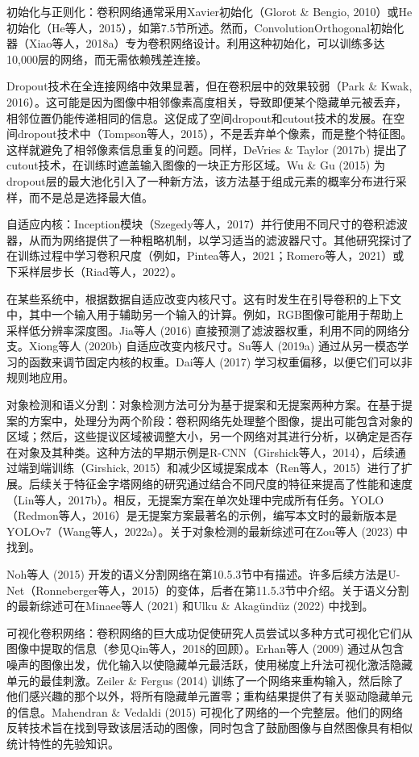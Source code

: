 \documentclass[lang=cn,newtx,10pt,scheme=chinese]{elegantbook}
\begin{document}
初始化与正则化：卷积网络通常采用Xavier初始化（Glorot \& Bengio, 2010）或He初始化（He等人，2015），如第7.5节所述。然而，ConvolutionOrthogonal初始化器（Xiao等人，2018a）专为卷积网络设计。利用这种初始化，可以训练多达10,000层的网络，而无需依赖残差连接。

Dropout技术在全连接网络中效果显著，但在卷积层中的效果较弱（Park \& Kwak, 2016）。这可能是因为图像中相邻像素高度相关，导致即便某个隐藏单元被丢弃，相邻位置仍能传递相同的信息。这促成了空间dropout和cutout技术的发展。在空间dropout技术中（Tompson等人，2015），不是丢弃单个像素，而是整个特征图。这样就避免了相邻像素信息重复的问题。同样，DeVries \& Taylor (2017b) 提出了cutout技术，在训练时遮盖输入图像的一块正方形区域。Wu \& Gu (2015) 为dropout层的最大池化引入了一种新方法，该方法基于组成元素的概率分布进行采样，而不是总是选择最大值。

自适应内核：Inception模块（Szegedy等人，2017）并行使用不同尺寸的卷积滤波器，从而为网络提供了一种粗略机制，以学习适当的滤波器尺寸。其他研究探讨了在训练过程中学习卷积尺度（例如，Pintea等人，2021；Romero等人，2021）或下采样层步长（Riad等人，2022）。

在某些系统中，根据数据自适应改变内核尺寸。这有时发生在引导卷积的上下文中，其中一个输入用于辅助另一个输入的计算。例如，RGB图像可能用于帮助上采样低分辨率深度图。Jia等人 (2016) 直接预测了滤波器权重，利用不同的网络分支。Xiong等人 (2020b) 自适应改变内核尺寸。Su等人 (2019a) 通过从另一模态学习的函数来调节固定内核的权重。Dai等人 (2017) 学习权重偏移，以便它们可以非规则地应用。

对象检测和语义分割：对象检测方法可分为基于提案和无提案两种方案。在基于提案的方案中，处理分为两个阶段：卷积网络先处理整个图像，提出可能包含对象的区域；然后，这些提议区域被调整大小，另一个网络对其进行分析，以确定是否存在对象及其种类。这种方法的早期示例是R-CNN（Girshick等人，2014），后续通过端到端训练（Girshick, 2015）和减少区域提案成本（Ren等人，2015）进行了扩展。后续关于特征金字塔网络的研究通过结合不同尺度的特征来提高了性能和速度（Lin等人，2017b）。相反，无提案方案在单次处理中完成所有任务。YOLO（Redmon等人，2016）是无提案方案最著名的示例，编写本文时的最新版本是YOLOv7（Wang等人，2022a）。关于对象检测的最新综述可在Zou等人 (2023) 中找到。

Noh等人 (2015) 开发的语义分割网络在第10.5.3节中有描述。许多后续方法是U-Net（Ronneberger等人，2015）的变体，后者在第11.5.3节中介绍。关于语义分割的最新综述可在Minaee等人 (2021) 和Ulku \& Akagündüz (2022) 中找到。

可视化卷积网络：卷积网络的巨大成功促使研究人员尝试以多种方式可视化它们从图像中提取的信息（参见Qin等人，2018的回顾）。Erhan等人 (2009) 通过从包含噪声的图像出发，优化输入以使隐藏单元最活跃，使用梯度上升法可视化激活隐藏单元的最佳刺激。Zeiler \& Fergus (2014) 训练了一个网络来重构输入，然后除了他们感兴趣的那个以外，将所有隐藏单元置零；重构结果提供了有关驱动隐藏单元的信息。Mahendran \& Vedaldi (2015) 可视化了网络的一个完整层。他们的网络反转技术旨在找到导致该层活动的图像，同时包含了鼓励图像与自然图像具有相似统计特性的先验知识。
\end{document}
